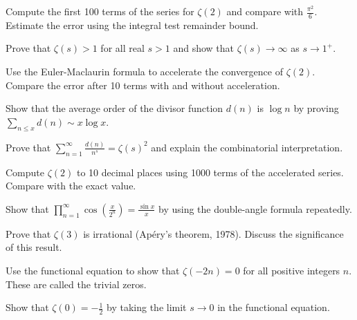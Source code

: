 \begin{exercise}
Compute the first 100 terms of the series for $\zeta(2)$ and compare with $\frac{\pi^2}{6}$. Estimate the error using the integral test remainder bound.
\end{exercise}

\begin{exercise}
Prove that $\zeta(s) > 1$ for all real $s > 1$ and show that $\zeta(s) \to \infty$ as $s \to 1^+$.
\end{exercise}

\begin{exercise}
Use the Euler-Maclaurin formula to accelerate the convergence of $\zeta(2)$. Compare the error after 10 terms with and without acceleration.
\end{exercise}

\begin{exercise}
Show that the average order of the divisor function $d(n)$ is $\log n$ by proving $\sum_{n \le x} d(n) \sim x \log x$.
\end{exercise}

\begin{exercise}
Prove that $\sum_{n=1}^\infty \frac{d(n)}{n^s} = \zeta(s)^2$ and explain the combinatorial interpretation.
\end{exercise}

\begin{exercise}
Compute $\zeta(2)$ to 10 decimal places using 1000 terms of the accelerated series. Compare with the exact value.
\end{exercise}

\begin{exercise}
Show that $\prod_{n=1}^\infty \cos\left(\frac{x}{2^n}\right) = \frac{\sin x}{x}$ by using the double-angle formula repeatedly.
\end{exercise}

\begin{exercise}
Prove that $\zeta(3)$ is irrational (Apéry's theorem, 1978). Discuss the significance of this result.
\end{exercise}

\begin{exercise}
Use the functional equation to show that $\zeta(-2n) = 0$ for all positive integers $n$. These are called the trivial zeros.
\end{exercise}

\begin{exercise}
Show that $\zeta(0) = -\frac{1}{2}$ by taking the limit $s \to 0$ in the functional equation.
\end{exercise}

